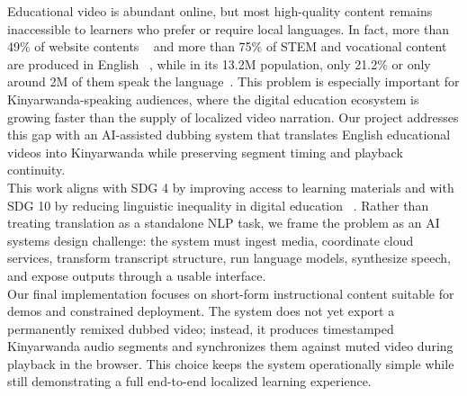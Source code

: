 \documentclass[conference]{IEEEtran}
\begin{document}
Educational video is abundant online, but most high-quality content remains inaccessible to learners who prefer or require local languages. In fact, more than 49\% of website contents ~\cite{w3techs_content_language} and more than 75\% of STEM and vocational content are produced in English ~\cite{hamel}, while in its 13.2M population, only 21.2\% or only around 2M of them speak the language~\cite{nisr}. This problem is especially important for Kinyarwanda-speaking audiences, where the digital education ecosystem is growing faster than the supply of localized video narration. Our project addresses this gap with an AI-assisted dubbing system that translates English educational videos into Kinyarwanda while preserving segment timing and playback continuity.\\
This work aligns with SDG 4 by improving access to learning materials and with SDG 10 by reducing linguistic inequality in digital education ~\cite{un_sdg,unesco_mother_tongue}. Rather than treating translation as a standalone NLP task, we frame the problem as an AI systems design challenge: the system must ingest media, coordinate cloud services, transform transcript structure, run language models, synthesize speech, and expose outputs through a usable interface.\\
Our final implementation focuses on short-form instructional content suitable for demos and constrained deployment. The system does not yet export a permanently remixed dubbed video; instead, it produces timestamped Kinyarwanda audio segments and synchronizes them against muted video during playback in the browser. This choice keeps the system operationally simple while still demonstrating a full end-to-end localized learning experience.
\end{document}
